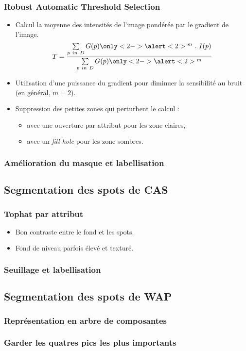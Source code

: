 \documentclass{beamer}
\begin{document}
    \frame
    {
      \frametitle{Robust Automatic Threshold Selection}
      \begin{itemize}
        \item<1->{Calcul la moyenne des intensités de l'image pondérée par le gradient de l'image.}
        $$
        T = \frac{\sum\limits_{p~in~D}G(p)\only<2->{\alert<2>{^m}}~.~I(p)}{\sum\limits_{p~in~D}G(p)\only<2->{\alert<2>{^m}}}
        $$
        \item<2->{Utilisation d'une puissance du gradient pour diminuer la sensibilité au bruit (en général, $m = 2$).}
        \item<3->{Suppression des petites zones qui perturbent le calcul :}
          \begin{itemize}
            \item avec une ouverture par attribut pour les zone claires,
            \item avec un {\em fill hole} pour les zone sombres.
          \end{itemize}
    
      \end{itemize}
    }
  
    \frame
    {
      \frametitle{Amélioration du masque et labellisation}
    }
    
  
  \subsection{Segmentation des spots de CAS}
    
    \frame
    {
      \frametitle{Tophat par attribut}
      \begin{itemize}
        \item Bon contraste entre le fond et les spots.
        \item Fond de niveau parfois élevé et texturé.
      \end{itemize}
    }
    
    \frame
    {
      \frametitle{Seuillage et labellisation}
    }
    
  \subsection{Segmentation des spots de WAP}
    
    \frame
    {
      \frametitle{Représentation en arbre de composantes}
    }
  
    \frame
    {
      \frametitle{Garder les quatres pics les plus importants}
    }
  
\end{document}
